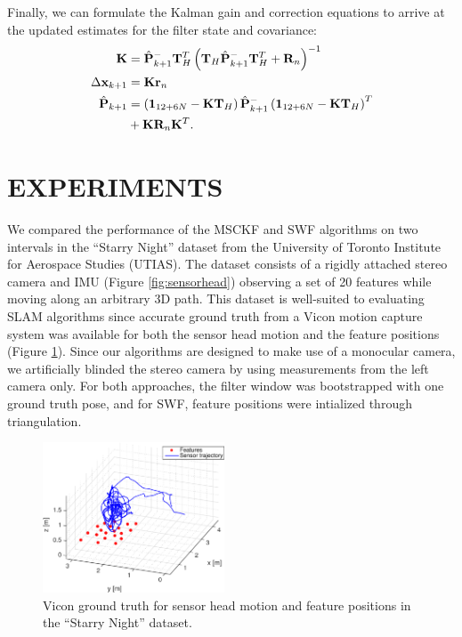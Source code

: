 \documentclass[letterpaper, 10 pt, conference]{ieeeconf}  %
\def\Vec#1{\mathbf{#1}}
\begin{document}
Finally, we can formulate the Kalman gain and correction equations to arrive at the updated estimates for the filter state and covariance:
\begin{align}
    \Vec{K} &= \hat{\Vec{P}}^-_{k+1}\Vec{T}_{H}^T\left(\Vec{T}_{H}\hat{\Vec{P}}^-_{k+1}\Vec{T}_{H}^T + \Vec{R}_{n} \right)^{-1} \\
    \Delta\Vec{x}_{k+1} &= \Vec{K}\Vec{r}_{n} \\
    \hat{\Vec{P}}_{k+1} &= \left(\Vec{1}_{12+6N} - \Vec{K}\Vec{T}_{H} \right)\hat{\Vec{P}}^-_{k+1}\left(\Vec{1}_{12+6N} - \Vec{K}\Vec{T}_{H} \right)^T \notag \\ 
                        &+ \Vec{K}\Vec{R}_{n}\Vec{K}^T .
\end{align}

\section{EXPERIMENTS} \label{sec:experiments}
We compared the performance of the MSCKF and SWF algorithms on two intervals in the ``Starry Night'' dataset from the University of Toronto Institute for Aerospace Studies (UTIAS).
The dataset consists of a rigidly attached stereo camera and IMU (Figure \ref{fig:sensorhead}) observing a set of 20 features while moving along an arbitrary 3D path.
This dataset is well-suited to evaluating SLAM algorithms since accurate ground truth from a Vicon motion capture system was available for both the sensor head motion and the feature positions (Figure \ref{fig:trajectory_groundtruth}).
Since our algorithms are designed to make use of a monocular camera, we artificially blinded the stereo camera by using measurements from the left camera only. For both approaches, the filter window was bootstrapped with one ground truth pose, and for SWF, feature positions were intialized through triangulation.



\begin{figure}
    \centering
    \includegraphics[width=0.48\textwidth]{figs/trajectory_groundtruth}
    \caption{Vicon ground truth for sensor head motion and feature positions in the ``Starry Night'' dataset.}
    \label{fig:trajectory_groundtruth}
\end{figure}
\end{document}
